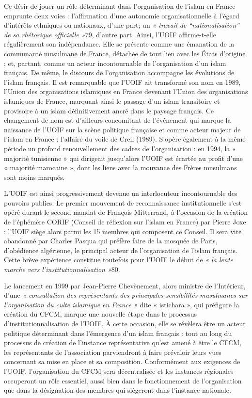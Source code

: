 Ce désir de jouer un rôle déterminant dans l'organisation de l'islam en
France emprunte deux voies : l'affirmation d'une autonomie
organisationnelle à l'égard d'intérêts ethniques ou nationaux, d'une
part; un \emph{« travail de ``nationalisation'' de sa rhétorique
officielle »}79, d'autre part. Ainsi, l'UOIF affirme-t-elle
régulièrement son indépendance. Elle se présente comme une émanation de
la communauté musulmane de France, détachée de tout lien avec les États
d'origine ; et, partant, comme un acteur incontournable de
l'organisation d'un islam français. De même, le discours de
l'organisation accompagne les évolutions de l'islam français. Il est
remarquable que l'UOIF ait transformé son nom en 1989, l'Union des
organisations islamiques en France devenant l'Union des organisations
islamiques de France, marquant ainsi le passage d'un islam transitoire
et provisoire à un islam définitivement ancré dans le paysage français.
Ce changement de nom est d'ailleurs concomitant de l'événement qui
marque la naissance de l'UOIF sur la scène politique française et comme
acteur majeur de l'islam en France : l'affaire du voile de Creil (1989).
S'opère également à la même période un profond renouvellement des cadres
de l'organisation : en 1994, la « majorité tunisienne » qui dirigeait
jusqu'alors l'UOIF est écartée au profit d'une « majorité marocaine »,
dont les liens avec la mouvance des Frères musulmans sont moins marqués.

L'UOIF est ainsi progressivement devenue un interlocuteur incontournable
des pouvoirs publics. Le premier mouvement de reconnaissance
institutionnelle s'est opéré durant le
second mandat de François Mitterrand, à l'occasion de la création de
l'éphémère CORIF (Conseil de réflexion sur l'islam en France) par Pierre
Joxe : l'UOIF siège alors parmi les 15 membres qui composent ce Conseil.
Il sera vite abandonné par Charles Pasqua qui préfère faire de la
mosquée de Paris, d'obédience algérienne, le principal acteur de
l'organisation de l'islam français. Cette brève expérience constitue
toutefois pour l'UOIF le début de \emph{« la lente marche vers
l'institutionnalisation »}80.

Le lancement en 1999 par Jean-Pierre Chevènement, alors ministre de
l'Intérieur, d'une \emph{« consultation des représentants des
principales sensibilités musulmanes sur l'organisation du culte
islamique en France »} dite « istichara », qui préfigure la création du
CFCM, marque une nouvelle étape dans le processus
d'institutionnalisation de l'UOIF. À cette occasion, elle se révèlera
être un acteur politique déterminant dans l'émergence d'un islam
français : tout au long du processus de création de l'instance
représentative qu'est amené à être le CFCM, les représentants de
l'association parviendront à faire prévaloir leurs vues concernant sa
mise en place et sa composition. Conformément aux exigences de l'UOIF,
l'organisation du CFCM sera décentralisée et les instances régionales
occuperont un rôle essentiel, aussi bien dans le fonctionnement de
l'organisation que dans la désignation des membres qui siègeront dans
l'instance nationale.

